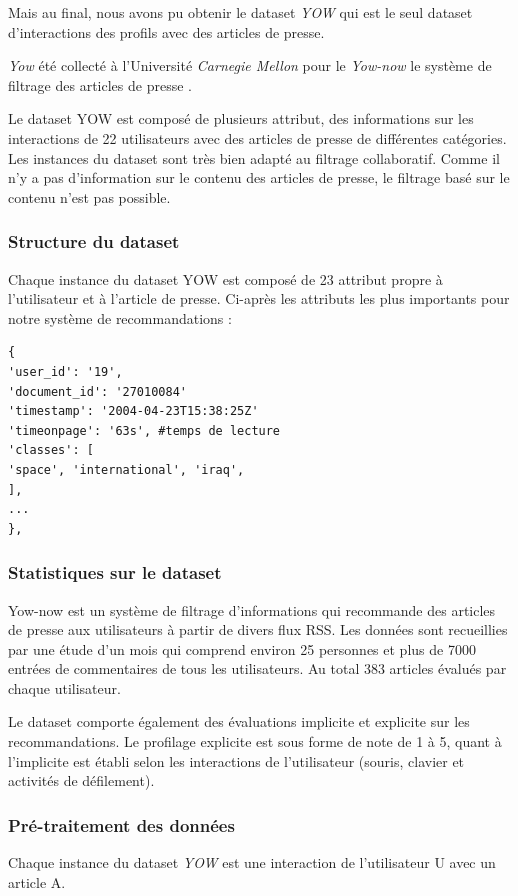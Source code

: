 Mais au final, nous avons pu obtenir le dataset \emph{YOW} qui est le seul dataset d'interactions des profils avec des articles de presse. 

\emph{Yow} été collecté à l'Université \emph{Carnegie Mellon} pour le \emph{Yow-now} le système de filtrage des articles de presse \cite{carnegieYOW}.

Le dataset YOW est composé de plusieurs attribut, des informations sur les interactions de 22 utilisateurs avec des articles de presse de différentes catégories. Les instances du dataset sont très bien adapté au filtrage collaboratif. Comme il n'y a pas d'information sur le contenu des articles de presse, le filtrage basé sur le contenu n'est pas possible. 

\subsubsection{Structure du dataset}
Chaque instance du dataset YOW est composé de 23 attribut propre à l'utilisateur et à l'article de presse. Ci-après les attributs les plus importants pour notre système de recommandations :  
\begin{lstlisting}[style=code] 
{
'user_id': '19', 
'document_id': '27010084'
'timestamp': '2004-04-23T15:38:25Z'
'timeonpage': '63s', #temps de lecture
'classes': [
'space', 'international', 'iraq', 
],
...
},
\end{lstlisting}

\subsubsection{Statistiques sur le dataset}
Yow-now est un système de filtrage d'informations qui recommande des articles de presse aux utilisateurs à partir de divers flux RSS. Les données sont recueillies par une étude d'un mois qui comprend environ 25 personnes et plus de 7000 entrées de commentaires de tous les utilisateurs. Au total 383 articles évalués par chaque utilisateur. 

Le dataset comporte également des évaluations implicite et explicite sur les recommandations. Le profilage explicite est sous forme de note de 1 à 5, quant à l'implicite est établi selon les interactions de l'utilisateur (souris, clavier et activités de défilement).


\subsubsection{Pré-traitement des données}
Chaque instance du dataset \emph{YOW} est une interaction de l'utilisateur U avec un article A.

